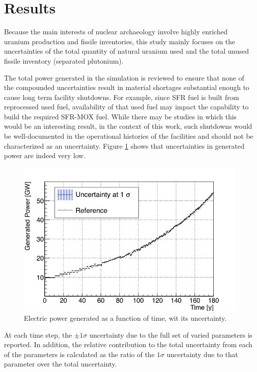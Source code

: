 \documentclass{anstrans}
\begin{document}
\section{Results}

Because the main interests of nuclear archaeology involve highly enriched uranium production and
fissile inventories, this study mainly focuses on the uncertainties of
the total quantity of natural uranium used and the total unused fissile
inventory (separated plutonium).

The total power generated in the simulation is reviewed to ensure that none of
the compounded uncertainties result in material shortages substantial enough to
cause long term facility shutdowns.  For example, since \gls{SFR} fuel is built
from reprocessed used fuel, availability of that used fuel may impact the
capability to build the required \gls{SFR}-\gls{MOX} fuel.  While there may be studies in
which this would be an interesting result, in the context of this work, such
shutdowns would be well-documented in the operational histories of the
facilities and should not be characterized as an uncertainty.  Figure
\ref{fig:power_full} shows that uncertainties in generated power are indeed
very low.

\begin{figure}[t] %
    \centering
    \includegraphics[scale=0.3]{power_full}
    \caption{Electric power generated as a function of time, wit its uncertainty.}\label{fig:power_full}
\end{figure}

At each time step, the $\pm1\sigma$ uncertainty due to the full set of varied
parameters is reported.  In addition, the relative contribution to the total
uncertainty from each of the parameters is calculated as the ratio of the
$1\sigma$ uncertainty due to that parameter over the total uncertainty.
\end{document}
